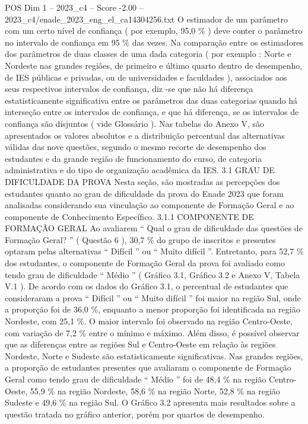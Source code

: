 \begin{textsample}{POS Dim 1 – 2023\_c4 – Score -2.00 – 2023\_c4/enade\_2023\_eng\_el\_ca14304256.txt}
O estimador de um parâmetro com um certo nível de confiança ( por exemplo, 95,0 \% ) deve conter o parâmetro no intervalo de confiança em 95 \% das vezes.
Na comparação entre os estimadores dos parâmetros de duas classes de uma dada categoria ( por exemplo : Norte e Nordeste nas grandes regiões, de primeiro e último quarto dentro de desempenho, de IES públicas e privadas, ou de universidades e faculdades ), associados aos seus respectivos intervalos de confiança, diz -se que não há diferença estatisticamente significativa entre os parâmetros das duas categorias quando há interseção entre os intervalos de confiança, e que há diferença, se os intervalos de confiança são disjuntos ( vide Glossário ).
Nas tabelas do Anexo V, são apresentados os valores absolutos e a distribuição percentual das alternativas válidas das nove questões, segundo o mesmo recorte de desempenho dos estudantes e da grande região de funcionamento do curso, de categoria administrativa e do tipo de organização acadêmica da IES. 3.1 GRAU DE DIFICULDADE DA PROVA Nesta seção, são mostradas as percepções dos estudantes quanto ao grau de dificuldade da prova do Enade 2023 que foram analisadas considerando sua vinculação ao componente de Formação Geral e ao componente de Conhecimento Específico. 3.1.1 COMPONENTE DE FORMAÇÃO GERAL Ao avaliarem “ Qual o grau de dificuldade das questões de Formação Geral? ” ( Questão 6 ), 30,7 \% do grupo de inscritos e presentes optaram pelas alternativas “ Difícil ” ou “ Muito difícil ”.
Entretanto, para 52,7 \% dos estudantes, o componente de Formação Geral da prova foi avaliado como tendo grau de dificuldade “ Médio ” ( Gráfico 3.1, Gráfico 3.2 e Anexo V, Tabela V.1 ).
De acordo com os dados do Gráfico 3.1, o percentual de estudantes que consideraram a prova “ Difícil ” ou “ Muito difícil ” foi maior na região Sul, onde a proporção foi de 36,0 \%, enquanto a menor proporção foi identificada na região Nordeste, com 25,1 \%.
O maior intervalo foi observado na região Centro-Oeste, com variação de 7,2 \% entre o mínimo e máximo.
Além disso, é possível observar que as diferenças entre as regiões Sul e Centro-Oeste em relação às regiões Nordeste, Norte e Sudeste são estatisticamente significativas.
Nas grandes regiões, a proporção de estudantes presentes que avaliaram o componente de Formação Geral como tendo grau de dificuldade “ Médio ” foi de 48,4 \% na região Centro-Oeste, 55,9 \% na região Nordeste, 58,6 \% na região Norte, 52,8 \% na região Sudeste e 49,6 \% na região Sul.
O Gráfico 3.2 apresenta mais resultados sobre a questão tratada no gráfico anterior, porém por quartos de desempenho.

\end{textsample}
